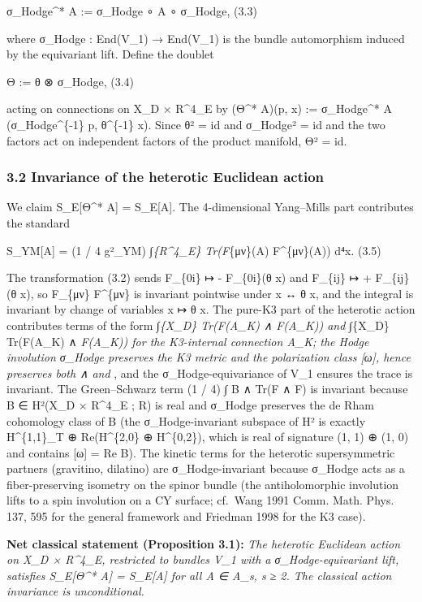 \documentclass[
 11pt,
 a4paper,
]{article}
\begin{document}
σ\_Hodge\^{}* A := σ\_Hodge ∘ A ∘ σ\_Hodge, (3.3)

where σ\_Hodge : End(V\_1) → End(V\_1) is the bundle automorphism induced by the equivariant lift. Define the doublet

Θ := θ ⊗ σ\_Hodge, (3.4)

acting on connections on X\_D × R\^{}4\_E by (Θ\^{}* A)(p, x) := σ\_Hodge\^{}* A (σ\_Hodge\^{}\{-1\} p, θ\^{}\{-1\} x). Since θ² = id and σ\_Hodge² = id and the two factors act on independent factors of the product manifold, Θ² = id.

\hypertarget{invariance-of-the-heterotic-euclidean-action}{%
\subsubsection{3.2 Invariance of the heterotic Euclidean action}\label{invariance-of-the-heterotic-euclidean-action}}

We claim S\_E{[}Θ\^{}* A{]} = S\_E{[}A{]}. The 4-dimensional Yang--Mills part contributes the standard

S\_YM{[}A{]} = (1 / 4 g²\_YM) ∫\emph{\{R\^{}4\_E\} Tr(F}\{μν\}(A) F\^{}\{μν\}(A)) d⁴x. (3.5)

The transformation (3.2) sends F\_\{0i\} ↦ - F\_\{0i\}(θ x) and F\_\{ij\} ↦ + F\_\{ij\}(θ x), so F\_\{μν\} F\^{}\{μν\} is invariant pointwise under x ↔ θ x, and the integral is invariant by change of variables x ↦ θ x. The pure-K3 part of the heterotic action contributes terms of the form ∫\emph{\{X\_D\} Tr(F(A\_K) ∧ F(A\_K)) and ∫}\{X\_D\} Tr(F(A\_K) ∧ \emph{F(A\_K)) for the K3-internal connection A\_K; the Hodge involution σ\_Hodge preserves the K3 metric and the polarization class {[}ω{]}, hence preserves both ∧ and }, and the σ\_Hodge-equivariance of V\_1 ensures the trace is invariant. The Green--Schwarz term (1 / 4) ∫ B ∧ Tr(F ∧ F) is invariant because B ∈ H²(X\_D × R\^{}4\_E ; R) is real and σ\_Hodge preserves the de Rham cohomology class of B (the σ\_Hodge-invariant subspace of H² is exactly H\^{}\{1,1\}\_T ⊕ Re(H\^{}\{2,0\} ⊕ H\^{}\{0,2\}), which is real of signature (1, 1) ⊕ (1, 0) and contains {[}ω{]} = Re B). The kinetic terms for the heterotic supersymmetric partners (gravitino, dilatino) are σ\_Hodge-invariant because σ\_Hodge acts as a fiber-preserving isometry on the spinor bundle (the antiholomorphic involution lifts to a spin involution on a CY surface; cf.~Wang 1991 Comm. Math. Phys. 137, 595 for the general framework and Friedman 1998 for the K3 case).

\textbf{Net classical statement (Proposition 3.1):} \emph{The heterotic Euclidean action on X\_D × R\^{}4\_E, restricted to bundles V\_1 with a σ\_Hodge-equivariant lift, satisfies S\_E{[}Θ\^{}* A{]} = S\_E{[}A{]} for all A ∈ A\_s, s ≥ 2. The classical action invariance is unconditional.}
\end{document}
